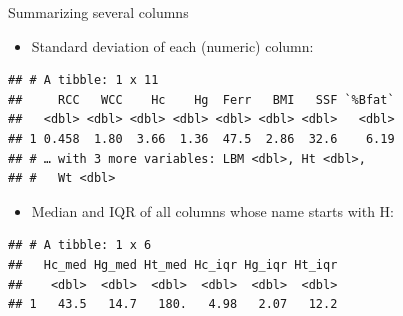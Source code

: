 \documentclass[ignorenonframetext,]{beamer}
\newenvironment{Shaded}{\begin{snugshade}}{\end{snugshade}}
\newcommand{\DataTypeTok}[1]{\textcolor[rgb]{0.13,0.29,0.53}{#1}}
\newcommand{\KeywordTok}[1]{\textcolor[rgb]{0.13,0.29,0.53}{\textbf{#1}}}
\newcommand{\NormalTok}[1]{#1}
\newcommand{\OperatorTok}[1]{\textcolor[rgb]{0.81,0.36,0.00}{\textbf{#1}}}
\newcommand{\StringTok}[1]{\textcolor[rgb]{0.31,0.60,0.02}{#1}}
\providecommand{\tightlist}{%
  \setlength{\itemsep}{0pt}\setlength{\parskip}{0pt}}
\begin{document}
\begin{frame}[fragile]{Summarizing several columns}
\protect\hypertarget{summarizing-several-columns}{}

\begin{itemize}
\tightlist
\item
  Standard deviation of each (numeric) column:
\end{itemize}

\small

\begin{Shaded}
\end{Shaded}

\begin{verbatim}
## # A tibble: 1 x 11
##     RCC   WCC    Hc    Hg  Ferr   BMI   SSF `%Bfat`
##   <dbl> <dbl> <dbl> <dbl> <dbl> <dbl> <dbl>   <dbl>
## 1 0.458  1.80  3.66  1.36  47.5  2.86  32.6    6.19
## # … with 3 more variables: LBM <dbl>, Ht <dbl>,
## #   Wt <dbl>
\end{verbatim}

\normalsize

\begin{itemize}
\tightlist
\item
  Median and IQR of all columns whose name starts with H:
\end{itemize}

\small

\begin{Shaded}
\end{Shaded}

\begin{verbatim}
## # A tibble: 1 x 6
##   Hc_med Hg_med Ht_med Hc_iqr Hg_iqr Ht_iqr
##    <dbl>  <dbl>  <dbl>  <dbl>  <dbl>  <dbl>
## 1   43.5   14.7   180.   4.98   2.07   12.2
\end{verbatim}

\normalsize

\end{frame}
\end{document}
